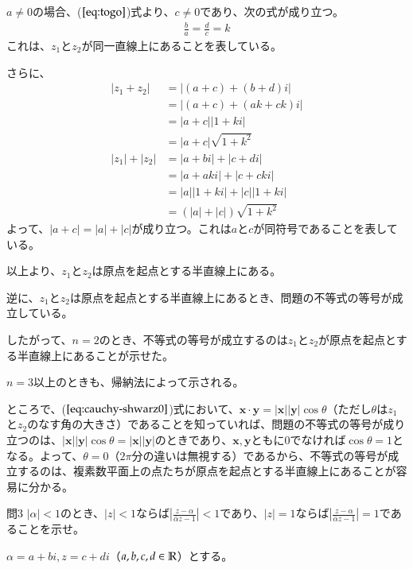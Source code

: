 $a\neq 0$の場合、($\ref{eq:togo}$)式より、$c\neq 0$であり、次の式が成り立つ。
\begin{align*}
    \frac{b}{a}=\frac{d}{c}=k
\end{align*}
これは、$z_1$と$z_2$が同一直線上にあることを表している。

さらに、
\begin{align*}
    |z_1+z_2|&=|(a+c)+(b+d)i|\\
    &=|(a+c)+(ak+ck)i|\\
    &=|a+c||1+ki|\\
    &=|a+c|\sqrt{1+k^2}\\
    |z_1|+|z_2|&=|a+bi|+|c+di|\\
    &=|a+aki|+|c+cki|\\
    &=|a||1+ki|+|c||1+ki|\\
    &=(|a|+|c|)\sqrt{1+k^2}
\end{align*}
よって、$|a+c|=|a|+|c|$が成り立つ。これは$a$と$c$が同符号であることを表している。

以上より、$z_1$と$z_2$は原点を起点とする半直線上にある。

逆に、$z_1$と$z_2$は原点を起点とする半直線上にあるとき、問題の不等式の等号が成立している。

したがって、$n=2$のとき、不等式の等号が成立するのは$z_1$と$z_2$が原点を起点とする半直線上にあることが示せた。

$n=3$以上のときも、帰納法によって示される。

ところで、($\ref{eq:cauchy-shwarz0}$)式において、$\bm{x}\cdot \bm{y}=|\bm{x}||\bm{y}|\cos \theta$（ただし$\theta$は$z_1$と$z_2$のなす角の大きさ）であることを知っていれば、問題の不等式の等号が成り立つのは、$|\bm{x}||\bm{y}|\cos \theta=|\bm{x}||\bm{y}|$のときであり、$\bm{x}, \bm{y}$ともに0でなければ$\cos \theta=1$となる。よって、$\theta=0$（$2\pi$分の違いは無視する）であるから、不等式の等号が成立するのは、複素数平面上の点たちが原点を起点とする半直線上にあることが容易に分かる。

\begin{mysimplebox}{問3}
    $|\alpha|<1$のとき、$|z|<1$ならば$\left|\frac{z-\alpha}{\bar{\alpha}z-1}\right|<1$であり、$|z|=1$ならば$\left|\frac{z-\alpha}{\bar{\alpha}z-1}\right|=1$であることを示せ。
\end{mysimplebox}

$\alpha=a+bi, z=c+di$（$a,b,c,d\in\mathbb{R}$）とする。

